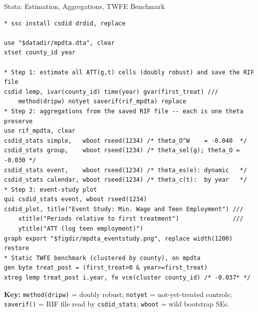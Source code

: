 \documentclass[main.tex]{subfiles}
\begin{document}
\begin{frame}[fragile]{Stata: Estimation, Aggregations, TWFE Benchmark}


\begin{lstlisting}
* ssc install csdid drdid, replace

use "$datadir/mpdta.dta", clear
xtset county_id year

* Step 1: estimate all ATT(g,t) cells (doubly robust) and save the RIF file
csdid lemp, ivar(county_id) time(year) gvar(first_treat) ///
    method(dripw) notyet saverif(rif_mpdta) replace
* Step 2: aggregations from the saved RIF file -- each is one theta
preserve
use rif_mpdta, clear
csdid_stats simple,   wboot rseed(1234) /* theta_O^W    = -0.040  */
csdid_stats group,    wboot rseed(1234) /* theta_sel(g); theta_O = -0.030 */
csdid_stats event,    wboot rseed(1234) /* theta_es(e): dynamic   */
csdid_stats calendar, wboot rseed(1234) /* theta_c(t):  by year   */
* Step 3: event-study plot
qui csdid_stats event, wboot rseed(1234)
csdid_plot, title("Event Study: Min. Wage and Teen Employment") ///
    xtitle("Periods relative to first treatment")               ///
    ytitle("ATT (log teen employment)")
graph export "$figdir/mpdta_eventstudy.png", replace width(1200)
restore
* Static TWFE benchmark (clustered by county), on mpdta
gen byte treat_post = (first_treat>0 & year>=first_treat)
xtreg lemp treat_post i.year, fe vce(cluster county_id) /* -0.037* */
\end{lstlisting}

  \textbf{Key:} \texttt{method(dripw)} = doubly robust;
  \texttt{notyet} = not-yet-treated controls;
  \texttt{saverif()} = RIF file read by \texttt{csdid\_stats};
  \texttt{wboot} = wild bootstrap SEs.

\end{frame}
\end{document}
